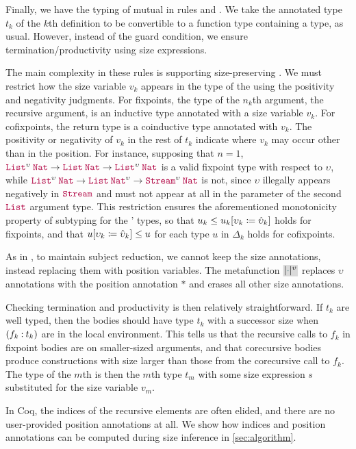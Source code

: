 Finally, we have the typing of mutual \cofixpoints in rules  and .
We take the annotated type $t_k$ of the $k$th \cofixpoint definition to be convertible to a function type containing a \coinductive type, as usual.
However, instead of the guard condition, we ensure termination/productivity using size expressions.

The main complexity in these rules is supporting size-preserving \cofixpoints.
We must restrict how the size variable $v_k$ appears in the type of the \cofixpoints using the positivity and negativity judgments.
For fixpoints, the type of the $n_k$th argument, the recursive argument, is an inductive type annotated with a size variable $v_k$.
For cofixpoints, the return type is a coinductive type annotated with $v_k$.
The positivity or negativity of $v_k$ in the rest of $t_k$ indicate where $v_k$ may occur other than in the \corecursive position.
For instance, supposing that $n = 1$,
$\app{\List^\upsilon}{\Nat} \to \app{\List}{\Nat} \to \app{\List^\upsilon}{\Nat}$
is a valid fixpoint type with respect to $\upsilon$, while
$\app{\List^\upsilon}{\Nat} \to \app{\List}{\Nat^\upsilon} \to \app{\Stream^\upsilon}{\Nat}$
is not, since $\upsilon$ illegally appears negatively in $\Stream$ and must not appear at all in the parameter of the second $\List$ argument type.
This restriction ensures the aforementioned monotonicity property of subtyping for the \cofixpoints' types,
so that $u_k \leq u_k [\upsilon_k \coloneqq \hat{\upsilon}_k]$ holds for fixpoints,
and that $u [\upsilon_k \coloneqq \hat{\upsilon}_k] \leq u$ for each type $u$ in $\Delta_k$ holds for cofixpoints.

As in , to maintain subject reduction, we cannot keep the size annotations, instead replacing them with position variables.
The metafunction $\new{\erase{\ph}^\upsilon}$ replaces $\upsilon$ annotations with the position annotation $\ast$ and erases all other size annotations.

Checking termination and productivity is then relatively straightforward.
If $t_k$ are well typed, then the \cofixpoint bodies should have type $t_k$ with a successor size when $(f_k \mathbin{:} t_k)$ are in the local environment.
This tells us that the recursive calls to $f_k$ in fixpoint bodies are on smaller-sized arguments, and that corecursive bodies produce constructions with size larger than those from the corecursive call to $f_k$.
The type of the $m$th \cofixpoint is then the $m$th type $t_m$ with some size expression $s$ substituted for the size variable $v_m$.

In Coq, the indices of the recursive elements are often elided, and there are no user-provided position annotations at all.
We show how indices and position annotations can be computed during size inference in \autoref{sec:algorithm}.


